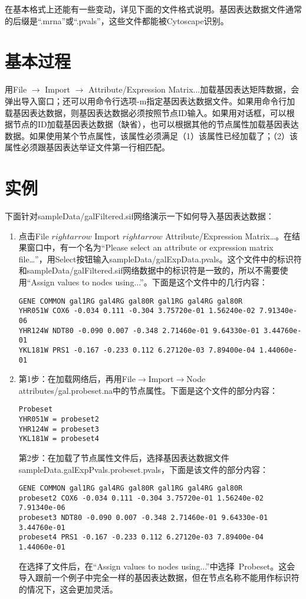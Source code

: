 在基本格式上还能有一些变动，详见下面的文件格式说明。基因表达数据文件通常的后缀是``.mrna''或``.pvals''，这些文件都能被Cytoscape识别。
\section{基本过程}
用File $\rightarrow$ Import $\rightarrow$ Attribute/Expression Matrix...加载基因表达矩阵数据，会弹出导入窗口；还可以用命令行选项-m指定基因表达数据文件。如果用命令行加载基因表达数据，则基因表达数据必须按照节点ID输入。如果用对话框，可以根据节点的ID加载基因表达数据（缺省），也可以根据其他的节点属性加载基因表达数据。如果使用某个节点属性，该属性必须满足（1）该属性已经加载了；（2）该属性必须跟基因表达举证文件第一行相匹配。
 
\section{实例}
下面针对sampleData/galFiltered.sif网络演示一下如何导入基因表达数据： 
\begin{enumerate}
\renewcommand{\labelenumi}{\textbf{Option \Alph{enumi}.}}
\item 点击File $rightarrow$ Import $rightarrow$ Attribute/Expression Matrix\ldots 。在结果窗口中，有一个名为``Please select an attribute or expression matrix file\ldots''，用Select按钮输入sampleData/galExpData.pvals。这个文件中的标识符和sampleData/galFiltered.sif网络数据中的标识符是一致的，所以不需要使用``Assign values to nodes using...''。下面是这个文件中的几行内容：
\begin{verbatim}
GENE COMMON gal1RG gal4RG gal80R gal1RG gal4RG gal80R
YHR051W COX6 -0.034 0.111 -0.304 3.75720e-01 1.56240e-02 7.91340e-06
YHR124W NDT80 -0.090 0.007 -0.348 2.71460e-01 9.64330e-01 3.44760e-01
YKL181W PRS1 -0.167 -0.233 0.112 6.27120e-03 7.89400e-04 1.44060e-01
\end{verbatim}
\item 第1步：在加载网络后，再用File$\rightarrow$Import$\rightarrow$Node attributes/gal.probeset.na中的节点属性。下面是这个文件的部分内容：
\begin{verbatim}
Probeset
YHR051W = probeset2
YHR124W = probeset3
YKL181W = probeset4
\end{verbatim}
第2步：在加载了节点属性文件后，选择基因表达数据文件sampleData.galExpPvals.probeset.pvals，下面是该文件的部分内容： 
\begin{verbatim}
GENE COMMON gal1RG gal4RG gal80R gal1RG gal4RG gal80R
probeset2 COX6 -0.034 0.111 -0.304 3.75720e-01 1.56240e-02 7.91340e-06
probeset3 NDT80 -0.090 0.007 -0.348 2.71460e-01 9.64330e-01 3.44760e-01
probeset4 PRS1 -0.167 -0.233 0.112 6.27120e-03 7.89400e-04 1.44060e-01
\end{verbatim}
在选择了文件后，在``Assign values to nodes using...''中选择~Probeset。这会导入跟前一个例子中完全一样的基因表达数据，但在节点名称不能用作标识符的情况下，这会更加灵活。
\end{enumerate}
